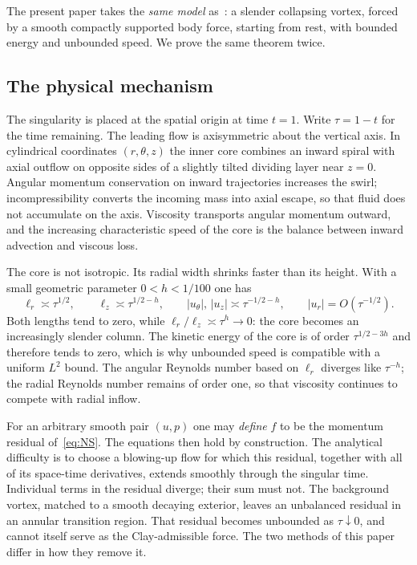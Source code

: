The present paper takes the \emph{same model} as~\cite{openai2026ns}: a slender collapsing vortex, forced by a smooth compactly supported body force, starting from rest, with bounded energy and unbounded speed. We prove the same theorem twice.

\subsection{The physical mechanism}
\label{sec:intro-physics}

The singularity is placed at the spatial origin at time $t=1$. Write $\tau=1-t$ for the time remaining. The leading flow is axisymmetric about the vertical axis. In cylindrical coordinates $(r,\theta,z)$ the inner core combines an inward spiral with axial outflow on opposite sides of a slightly tilted dividing layer near $z=0$. Angular momentum conservation on inward trajectories increases the swirl; incompressibility converts the incoming mass into axial escape, so that fluid does not accumulate on the axis. Viscosity transports angular momentum outward, and the increasing characteristic speed of the core is the balance between inward advection and viscous loss.

The core is not isotropic. Its radial width shrinks faster than its height. With a small geometric parameter $0<h<1/100$ one has
\begin{equation}
\label{eq:intro-scales}
\ell_r\asymp\tau^{1/2},
\qquad
\ell_z\asymp\tau^{1/2-h},
\qquad
|u_\theta|,\,|u_z|\asymp\tau^{-1/2-h},
\qquad
|u_r|=O(\tau^{-1/2}).
\end{equation}
Both lengths tend to zero, while $\ell_r/\ell_z\asymp\tau^h\to 0$: the core becomes an increasingly slender column. The kinetic energy of the core is of order $\tau^{1/2-3h}$ and therefore tends to zero, which is why unbounded speed is compatible with a uniform $L^2$ bound. The angular {R}eynolds number based on $\ell_r$ diverges like $\tau^{-h}$; the radial {R}eynolds number remains of order one, so that viscosity continues to compete with radial inflow.

For an arbitrary smooth pair $(u,p)$ one may \emph{define} $f$ to be the momentum residual of~\eqref{eq:NS}. The equations then hold by construction. The analytical difficulty is to choose a blowing-up flow for which this residual, together with all of its space-time derivatives, extends smoothly through the singular time. Individual terms in the residual diverge; their sum must not. The background vortex, matched to a smooth decaying exterior, leaves an unbalanced residual in an annular transition region. That residual becomes unbounded as $\tau\downarrow 0$, and cannot itself serve as the {C}lay-admissible force. The two methods of this paper differ in how they remove it.

